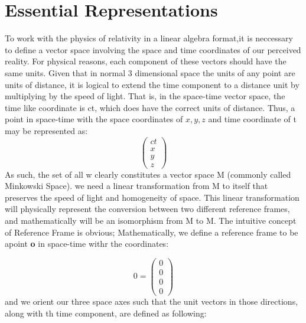 \documentclass[11]{article}
\begin{document}
\section{Essential Representations}

To work with the physics of relativity in a linear algebra format,it is neccessary to define a vector space involving the space and time coordinates of our perceived reality. For physical reasons, each component of
these vectors should have the same units. Given that in normal 3 dimensional space the units of any point
are units of distance, it is logical to extend the time component to a distance unit by multiplying by the speed
of light. That is, in the space-time vector space, the time like coordinate is ct, which does have the correct
units of distance. Thus, a point in space-time with the space coordinates of $x, y, z$ and time coordinate of t
may be represented as:
\[
\begin{pmatrix}
ct\\
x\\
y\\
z
\end{pmatrix}
\]
\newpage
As such, the set of all w clearly constitutes a vector space M (commonly called Minkowski Space). we need a linear transformation from M to itself that preserves the speed of light
and homogeneity of space. This linear transformation will physically represent the conversion between two
different reference frames, and mathematically will be an isomorphism from M to M.
The intuitive concept of Reference Frame is obvious; 
Mathematically, we define a reference frame to be apoint \textbf{o} in space-time withr the coordinates:

$$
0=\begin{pmatrix}
0\\
0\\
0\\
0
\end{pmatrix}
$$
and we orient our three space axes such that the unit vectors in those directions, along with th time component, are defined as following:
\end{document}
